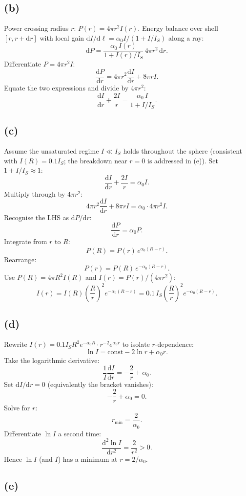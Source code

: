 \documentclass[11pt]{article}
\newcommand{\de}{\mathrm{d}}
\begin{document}
\subsection*{(b)}

Power crossing radius $r$: $P(r)=4\pi r^2 I(r)$. Energy balance over shell $[r,r+\de r]$ with local gain $\de I/\de\ell=\alpha_0 I/(1+I/I_S)$ along a ray:
\[
\de P=\frac{\alpha_0\,I(r)}{1+I(r)/I_S}\,4\pi r^2\,\de r.
\]
Differentiate $P=4\pi r^2 I$:
\[
\frac{\de P}{\de r}=4\pi r^2\frac{\de I}{\de r}+8\pi r I.
\]
Equate the two expressions and divide by $4\pi r^2$:
\[
\boxed{\;\frac{\de I}{\de r}+\frac{2I}{r}=\frac{\alpha_0\,I}{1+I/I_S}.\;}
\]

\subsection*{(c)}

Assume the unsaturated regime $I\ll I_S$ holds throughout the sphere (consistent with $I(R)=0.1 I_S$; the breakdown near $r=0$ is addressed in (e)). Set $1+I/I_S\approx 1$:
\[
\frac{\de I}{\de r}+\frac{2I}{r}=\alpha_0 I.
\]
Multiply through by $4\pi r^2$:
\[
4\pi r^2\frac{\de I}{\de r}+8\pi r I=\alpha_0\cdot 4\pi r^2 I.
\]
Recognise the LHS as $\de P/\de r$:
\[
\frac{\de P}{\de r}=\alpha_0 P.
\]
Integrate from $r$ to $R$:
\[
P(R)=P(r)\,e^{\alpha_0(R-r)}.
\]
Rearrange:
\[
P(r)=P(R)\,e^{-\alpha_0(R-r)}.
\]
Use $P(R)=4\pi R^2 I(R)$ and $I(r)=P(r)/(4\pi r^2)$:
\[
\boxed{\;I(r)=I(R)\!\left(\frac{R}{r}\right)^{\!2}e^{-\alpha_0(R-r)}=0.1\,I_S\!\left(\frac{R}{r}\right)^{\!2}e^{-\alpha_0(R-r)}.\;}
\]

\subsection*{(d)}

Rewrite $I(r)=0.1 I_S R^2 e^{-\alpha_0 R}\cdot r^{-2}e^{\alpha_0 r}$ to isolate $r$-dependence:
\[
\ln I=\text{const}-2\ln r+\alpha_0 r.
\]
Take the logarithmic derivative:
\[
\frac{1}{I}\frac{\de I}{\de r}=-\frac{2}{r}+\alpha_0.
\]
Set $\de I/\de r=0$ (equivalently the bracket vanishes):
\[
-\frac{2}{r}+\alpha_0=0.
\]
Solve for $r$:
\[
\boxed{\;r_\text{min}=\frac{2}{\alpha_0}.\;}
\]
Differentiate $\ln I$ a second time:
\[
\frac{\de^2\ln I}{\de r^2}=\frac{2}{r^2}>0.
\]
Hence $\ln I$ (and $I$) has a minimum at $r=2/\alpha_0$.

\subsection*{(e)}
\end{document}

